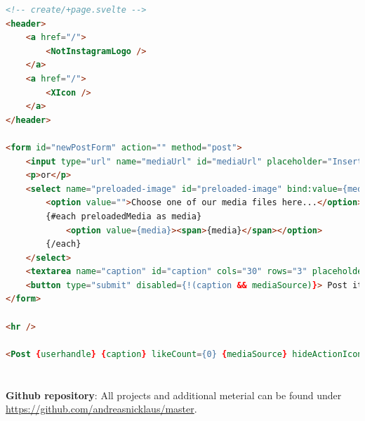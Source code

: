 \documentclass[a4paper, 10pt]{article}
\makeatletter
\renewcommand\listoffigures{%
  \section{\listfigurename}%
  \@mkboth{\MakeUppercase\listfigurename}{\MakeUppercase\listfigurename}%
  \@starttoc{lof}%
}
\renewcommand\listoftables{%
  \section{\listtablename}%
  \@mkboth{\MakeUppercase\listtablename}{\MakeUppercase\listtablename}%
  \@starttoc{lot}%
}
\makeatother
\begin{document}
\begin{lstlisting}[caption=Create in Svelte (Template), label={lst:Svelte:Create:Template}, language=HTML, firstnumber=20]
<!-- create/+page.svelte -->
<header>
	<a href="/">
		<NotInstagramLogo />
	</a>
	<a href="/">
		<XIcon />
	</a>
</header>

<form id="newPostForm" action="" method="post">
	<input type="url" name="mediaUrl" id="mediaUrl" placeholder="Insert your media URL here..." bind:value={mediaUrl}/>
	<p>or</p>
	<select name="preloaded-image" id="preloaded-image" bind:value={mediaChoice}>
		<option value="">Choose one of our media files here...</option>
		{#each preloadedMedia as media}
			<option value={media}><span>{media}</span></option>
		{/each}
	</select>
	<textarea name="caption" id="caption" cols="30" rows="3" placeholder="Type your caption here" bind:value={caption} />
	<button type="submit" disabled={!(caption && mediaSource)}> Post it! </button>
</form>

<hr />

<Post {userhandle} {caption} likeCount={0} {mediaSource} hideActionIcons={true} />
\end{lstlisting}


\pagebreak

\listoffigures

\listoftables

\glsaddall
\printnoidxglossary[
  type=\acronymtype,
  style=long
]

\nocite{*}
{}

\vfill
\textbf{Github repository}: All projects and additional meterial can be found under \url{https://github.com/andreasnicklaus/master}.
\end{document}
